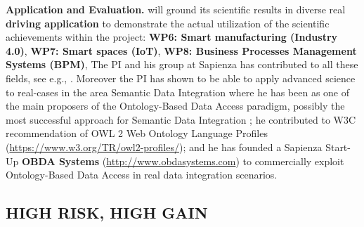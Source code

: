 \textbf{Application and Evaluation.}
\project will ground its scientific results in
diverse real \textbf{driving application} to demonstrate the actual utilization of the scientific
achievements within the project: \textbf{WP6: Smart manufacturing (Industry 4.0)},
\textbf{WP7: Smart spaces (IoT)},
\textbf{WP8: Business Processes Management Systems (BPM)},
The PI and his group at Sapienza has
contributed to all these fields, see e.g.,
\cite{DeGiacomoCFHM12,DeGiacomoDMM15,SilvaFCLSR17}.  Moreover the PI
has shown to be able to apply advanced science to real-cases in the
area Semantic Data Integration where he has been as one of the main
proposers of the Ontology-Based Data Access paradigm, possibly the
most successful approach for Semantic Data Integration \cite{PoggiLCGLR08,SequedaM17,Statoil17}; he
contributed to W3C recommendation of OWL 2 Web Ontology Language
Profiles (\url{https://www.w3.org/TR/owl2-profiles/}); and he has
founded a Sapienza Start-Up \textbf{OBDA Systems}
(\url{http://www.obdasystems.com}) to  commercially exploit Ontology-Based Data Access  in real data integration scenarios. 








\vspace{-1ex}
\subsection*{HIGH RISK, HIGH GAIN}

\vspace{-1ex}

